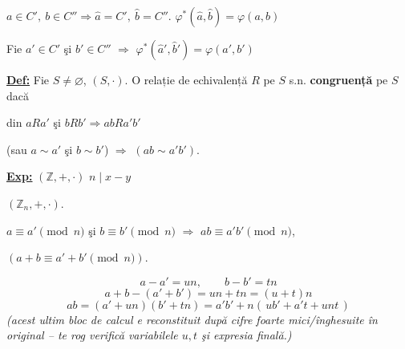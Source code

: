 \documentclass[12pt]{article}
\begin{document}
\noindent $a\in C',\ b\in C'' \Rightarrow \hat a = C',\ \hat b = C''$. \quad $\varphi^*(\hat a,\hat b) = \varphi(a,b)$

\noindent Fie $a'\in C'$ şi $b'\in C''$ $\Rightarrow$ $\varphi^*(\hat a',\hat b') = \varphi(a',b')$

\bigskip
\noindent\underline{\textbf{Def:}} Fie $S\neq\varnothing$, $(S,\cdot)$. O relație de echivalență $R$ pe $S$ s.n. \textbf{congruență} pe $S$ dacă

\noindent din $aRa'$ şi $bRb' \Rightarrow abRa'b'$

\noindent (sau $a\sim a'$ şi $b\sim b'$) $\Rightarrow$ $(ab\sim a'b')$.

\bigskip
\noindent\underline{\textbf{Exp:}} $(\mathbb{Z},+,\cdot)$ \qquad $n \mid x-y$

\noindent $(\mathbb{Z}_n,+,\cdot)$.

\noindent $a\equiv a' \pmod n$ şi $b\equiv b' \pmod n$ $\Rightarrow$ $ab\equiv a'b' \pmod n$,

\noindent $(a+b\equiv a'+b' \pmod n)$.

\[
a-a' = un,\qquad b-b'=tn
\]
\[
a+b-(a'+b') = un+tn = (u+t)n
\]
\[
ab = (a'+un)(b'+tn) = a'b' + n(\,ub'+a't+unt\,)
\]
\noindent\textit{(acest ultim bloc de calcul e reconstituit după cifre foarte mici/înghesuite în original -- te rog verifică variabilele $u,t$ şi expresia finală.)}
\end{document}
